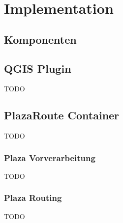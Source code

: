 
\section{Implementation}
\label{sec:Implementation}

\subsection{Komponenten}
\label{impl:Komponenten}

\subsection{QGIS Plugin}
\label{impl:QGIS Plugin}
TODO

\subsection{PlazaRoute Container}
\label{impl:PlazaRoute Container}
TODO

\subsubsection{Plaza Vorverarbeitung}
\label{impl:Plaza Vorverarbeitung}
TODO

\subsubsection{Plaza Routing}
\label{impl:Plaza Routing}
TODO

